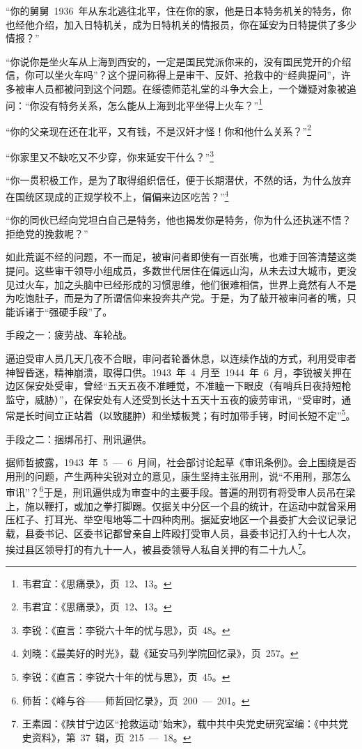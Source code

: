 “你的舅舅~1936~年从东北逃往北平，住在你的家，他是日本特务机关的特务，你也经他介绍，加入日特机关，成为日特机关的情报员，你在延安为日特提供了多少情报？”

“你说你是坐火车从上海到西安的，一定是国民党派你来的，没有国民党开的介绍信，你可以坐火车吗”？这个提问称得上是审干、反奸、抢救中的“经典提问”，许多被审人员都被问到这个问题。在绥德师范礼堂的斗争大会上，一个嫌疑对象被追问：“你没有特务关系，怎么能从上海到北平坐得上火车？”\footnote{韦君宜：《思痛录》，页~12、13。}

“你的父亲现在还在北平，又有钱，不是汉奸才怪！你和他什么关系？”\footnote{韦君宜：《思痛录》，页~12、13。}

“你家里又不缺吃又不少穿，你来延安干什么？”\footnote{李锐：《直言：李锐六十年的忧与思》，页~48。}

“你一贯积极工作，是为了取得组织信任，便于长期潜伏，不然的话，为什么放弃在国统区现成的正规学校不上，偏偏来边区吃苦？”\footnote{刘晓：《最美好的时光》，载《延安马列学院回忆录》，页~257。}

“你的同伙已经向党坦白自己是特务，他也揭发你是特务，你为什么还执迷不悟？拒绝党的挽救呢？”

如此荒诞不经的问题，不一而足，被审问者即使有一百张嘴，也难于回答清楚这类提问。这些审干领导小组成员，多数世代居住在偏远山沟，从未去过大城市，更没见过火车，加之头脑中已经形成的习惯思维，他们很难相信，世界上竟然有人不是为吃饱肚子，而是为了所谓信仰来投奔共产党。于是，为了敲开被审问者的嘴，只能诉诸于“强硬手段”了。

手段之一：疲劳战、车轮战。

逼迫受审人员几天几夜不合眼，审问者轮番休息，以连续作战的方式，利用受审者神智昏迷，精神崩溃，取得口供。1943~年~4~月至~1944~年~6~月，李锐被关押在边区保安处受审，曾经“五天五夜不准睡觉，不准瞌一下眼皮（有哨兵日夜持短枪监守，威胁）”，在保安处有人还受到长达十五天十五夜的疲劳审讯，“受审时，通常是长时间立正站着（以致腿肿）和坐矮板凳；有时加带手铐，时间长短不定”\footnote{李锐：《直言：李锐六十年的忧与思》，页~45。}。

手段之二：捆绑吊打、刑讯逼供。

据师哲披露，1943~年~5~—~6~月间，社会部讨论起草《审讯条例》。会上围绕是否用刑的问题，产生两种尖锐对立的意见，康生坚持主张用刑，说“不用刑，那怎么审讯”？\footnote{师哲：《峰与谷——师哲回忆录》，页~200~—~201。}于是，刑讯逼供成为审查中的主要手段。普遍的刑罚有将受审人员吊在梁上，施以鞭打，或加之拳打脚踢。仅据关中分区一个县的统计，在运动中就曾采用压杠子、打耳光、举空甩地等二十四种肉刑。据延安地区一个县委扩大会议记录记载，县委书记、区委书记都曾亲自上阵殴打受审人员，县委书记打入约十七人次，挨过县区领导打的有九十一人，被县委领导人私自关押的有二十九人\footnote{王素园：《陕甘宁边区“抢救运动”始末》，载中共中央党史研究室编：《中共党史资料》，第~37~辑，页~215~—~18。}。

